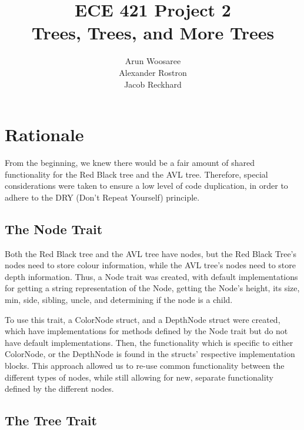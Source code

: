 \documentclass[letterpaper]{article}
\title{ECE 421 Project 2\\
Trees, Trees, and More Trees}
\author{Arun Woosaree\\
Alexander Rostron\\
Jacob Reckhard
}
\begin{document}
\maketitle %

\section{Rationale}
From the beginning, we knew there would be a fair amount of shared functionality
for the Red Black tree and the AVL tree. Therefore, special considerations were
taken to ensure a low level of code duplication, in order to adhere to the DRY
(Don't Repeat Yourself) principle.

\subsection{The Node Trait}\label{dry}
Both the Red Black tree and the AVL tree have nodes, but the Red Black Tree's
nodes need to store colour information, while the AVL tree's nodes need to store
depth information. Thus, a Node trait was created, with default implementations
for getting a string representation of the Node, getting the Node's height, its
size, min, side, sibling, uncle, and determining if the node is a child.

To use this trait, a ColorNode struct, and a DepthNode struct were created,
which have implementations for methods defined by the Node trait but do not have
default implementations. Then, the functionality which is specific to either
ColorNode, or the DepthNode is found in the structs' respective implementation
blocks. This approach allowed us to re-use common functionality between the
different types of nodes, while still allowing for new, separate functionality
defined by the different nodes. 

\subsection{The Tree Trait}
\end{document}
